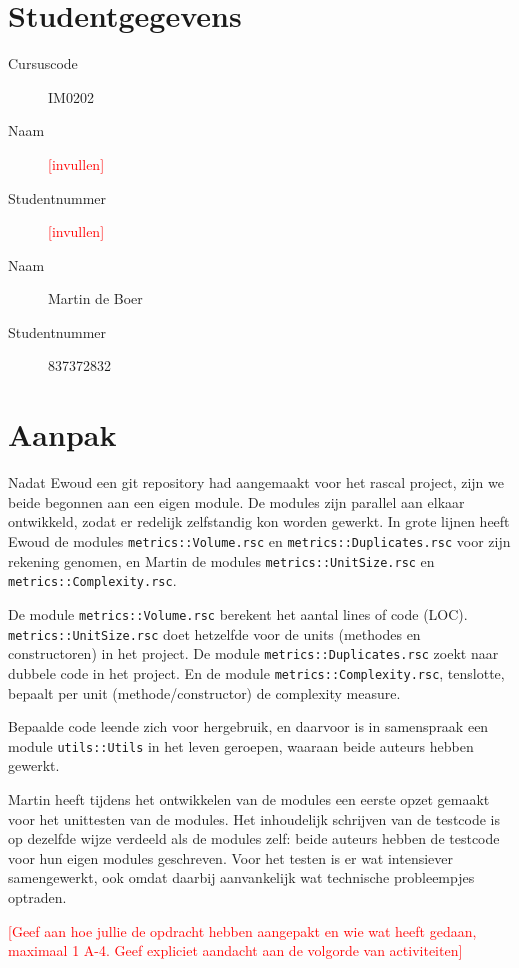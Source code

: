 \documentclass[a4paper]{article}
\newcommand{\todo}[1]{\textcolor{red}{[#1]}}
\begin{document}
\pagestyle{fancy}

\section*{Studentgegevens}
\begin{description}
	\item [Cursuscode] IM0202
	\item [Naam] \todo{invullen}
	\item [Studentnummer] \todo{invullen}
	\item [Naam] Martin de Boer
	\item [Studentnummer] 837372832
\end{description}

\section*{Aanpak}
Nadat Ewoud een git repository had aangemaakt voor het rascal project, zijn we beide begonnen aan een eigen module. De modules zijn parallel aan elkaar ontwikkeld, zodat er redelijk zelfstandig kon worden gewerkt. In grote lijnen heeft Ewoud de modules \texttt{metrics::Volume.rsc} en \texttt{metrics::Duplicates.rsc} voor zijn rekening genomen, en Martin de modules \texttt{metrics::UnitSize.rsc} en \texttt{metrics::Complexity.rsc}. 

De module \texttt{metrics::Volume.rsc} berekent het aantal lines of code (LOC). \texttt{metrics::UnitSize.rsc} doet hetzelfde voor de units (methodes en constructoren) in het project. De module \texttt{metrics::Duplicates.rsc} zoekt naar dubbele code in het project. En de module \texttt{metrics::Complexity.rsc}, tenslotte, bepaalt per unit (methode/constructor) de complexity measure.

Bepaalde code leende zich voor hergebruik, en daarvoor is in samenspraak een module \texttt{utils::Utils} in het leven geroepen, waaraan beide auteurs hebben gewerkt. 

Martin heeft tijdens het ontwikkelen van de modules een eerste opzet gemaakt voor het unittesten van de modules. Het inhoudelijk schrijven van de testcode is op dezelfde wijze verdeeld als de modules zelf: beide  auteurs hebben de testcode voor hun eigen modules geschreven. Voor het testen is er wat intensiever samengewerkt, ook omdat daarbij aanvankelijk wat technische probleempjes optraden. 

\todo{Geef aan hoe jullie de opdracht hebben aangepakt en wie wat heeft gedaan, maximaal 1 A-4. Geef expliciet aandacht aan de volgorde van activiteiten}
\end{document}

